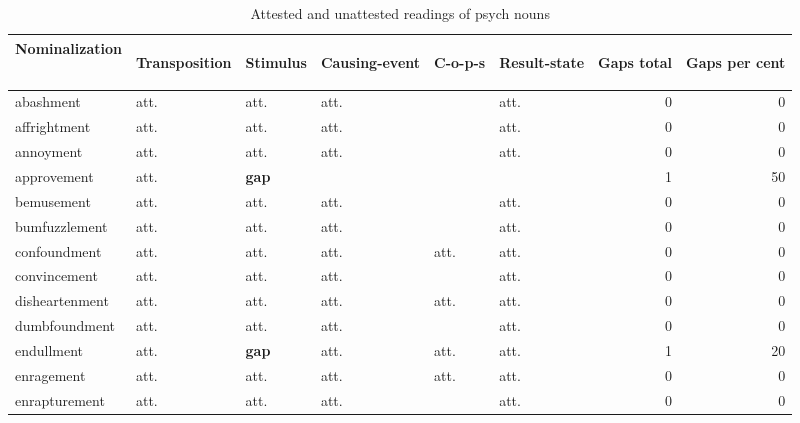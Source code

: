 \begin{table}
\caption[Attested and unattested readings of psych nouns]{Attested and unattested readings of psych nouns} 
\label{tab:GapsPsych}
\begin{tabular}{llllllrr}
\lsptoprule
Nominalization & \begin{sideways}Transposition\end{sideways}& \begin{sideways}Stimulus\end{sideways}& \begin{sideways}Causing-event\end{sideways}& \begin{sideways}C-o-p-s\end{sideways}& \begin{sideways}Result-state\end{sideways}& \begin{sideways}Gaps total\end{sideways}& \begin{sideways}Gaps per cent\end{sideways}\\
\midrule
 abashment      & att.  & att. & att.        &         & att. & 0 & 0 \\
affrightment   & att.  & att. & att.        &         & att. & 0 & 0  \\
 annoyment      & att.  & att. & att.        &         & att.& 0 & 0   \\
approvement    & att.  & \textbf{gap}  &         &         &      &  1 & 50  \\
 bemusement     & att.  & att. & att.        &         & att.  & 0 & 0 \\
bumfuzzlement  & att.  & att. & att.        &         & att. & 0 & 0  \\
 confoundment   & att.  & att. & att.        &   att.      & att. & 0 & 0  \\
convincement   & att.  & att. & att.        &         & att. & 0 & 0  \\
 disheartenment & att.  & att. & att.        &      att.   & att. & 0 & 0  \\
dumbfoundment  & att.  & att. & att.        &         & att. & 0 & 0  \\
 endullment     & att.  & \textbf{gap}  & att.        & att.    & att. &  1 & 20  \\
enragement     & att.  & att. & att.        & att.    & att. & 0 & 0  \\
 enrapturement  & att.  & att. & att.        &         & att. & 0 & 0  \\

\end{tabular}
\end{table}
